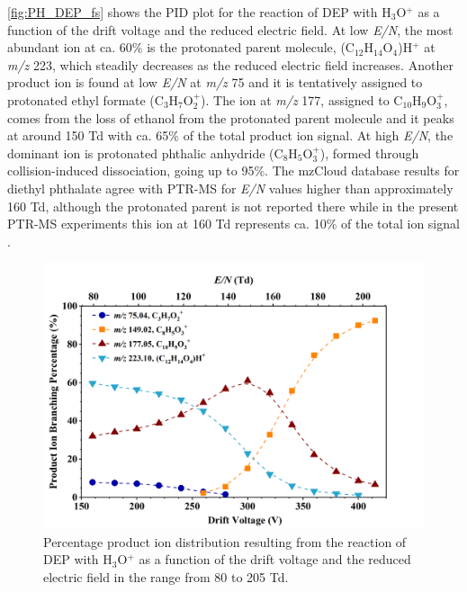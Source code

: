 \autoref{fig:PH_DEP_fs} shows the PID plot for the reaction of DEP with H$_3$O$^+$ as a function of the drift voltage and the reduced electric field.
At low \textit{E/N}, the most abundant ion at ca. 60\% is the protonated parent molecule, (C$_{12}$H$_{14}$O$_4$)H$^+$  at \textit{m/z} 223, which steadily decreases as the reduced electric field increases.
%
Another product ion is found at low \textit{E/N} at \textit{m/z} 75 and it is tentatively assigned to protonated ethyl formate (C$_3$H$_{7}$O$_2^+$).
The ion at \textit{m/z} 177, assigned to C$_{10}$H$_{9}$O$_3^+$, comes from the loss of ethanol from the protonated parent molecule and it peaks at around 150 Td with ca. 65\% of the total product ion signal.
At high \textit{E/N}, the dominant ion is protonated phthalic anhydride (C$_8$H$_{5}$O$_3^+$), formed through collision-induced dissociation, going up to 95\%. %
%
The mzCloud database results for diethyl phthalate agree with  PTR-MS %
for  \textit{E/N} values higher than approximately 160 Td, although the protonated parent is not reported there while in the present PTR-MS experiments this ion at 160 Td represents ca. 10\% of the total ion signal 
\cite{mzcloudDEP}.

\begin{figure}[htb]%
\centering
\includegraphics[height=0.35\textheight]{pics/DEP-BR.png}
\caption{Percentage product ion distribution resulting from the reaction of DEP with H$_3$O$^+$ as a function of the drift voltage and the reduced electric field in the range from 80 to 205 Td.}
\label{fig:PH_DEP_fs}
\end{figure}



